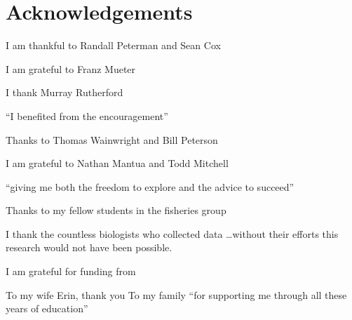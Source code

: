 

\chapter*{Acknowledgements}

I am thankful to Randall Peterman and Sean Cox

I am grateful to Franz Mueter 

I thank Murray Rutherford

``I benefited from the encouragement''

Thanks to Thomas Wainwright and Bill Peterson

I am grateful to Nathan Mantua and Todd Mitchell

``giving me both the freedom to explore and the advice to succeed''

Thanks to my fellow students in the fisheries group 

I thank the countless biologists who collected data \ldots without their efforts
this research would not have been possible.

I am grateful for funding from


To my wife Erin, thank you
To my family ``for supporting me through all these years of education''

